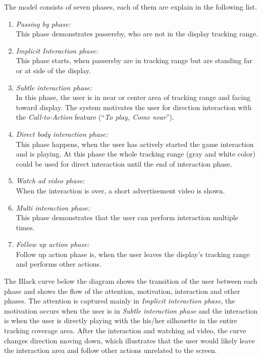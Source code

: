 The model consists of seven phases, each of them are explain in the following list.

\begin{enumerate}
\item \emph{Passing by phase:} \\
This phase demonstrates passersby, who are not in the display tracking range.

\item \emph{Implicit Interaction phase:} \\
This phase starts, when passersby are in tracking range but are standing far or at side of the display. 

\item \emph{Subtle interaction phase:} \\
In this phase, the user is in near or center area of tracking range and facing toward display. The system motivates the user for direction interaction with the \emph{Call-to-Action} feature (``\emph{To play, Come near}'').

\item \emph{Direct body interaction phase:} \\
This phase happens, when the user has actively started the game interaction and is playing. At this phase the whole tracking range (gray and white color) could be used for direct interaction until the end of interaction phase.

\item \emph{Watch ad video phase:} \\
When the interaction is over, a short advertisement video is shown.

\item \emph{Multi interaction phase:} \\
This phase demonstrates that the user can perform interaction multiple times.

\item \emph{Follow up action phase:} \\
Follow up action phase is, when the user leaves the display’s tracking range and performs other actions.

\end{enumerate}


The Black curve below the diagram shows the transition of the user between each phase and shows the flow of the attention, motivation, interaction and other phases. The attention is captured mainly in \emph{Implicit interaction phase}, the motivation occurs when the user is in \emph{Subtle interaction phase} and the interaction is when the user is directly playing with the his/her silhouette in the entire tracking coverage area. After the interaction and watching ad video, the curve changes direction moving down, which illustrates that the user would likely leave the interaction area and follow other actions unrelated to the screen. 

